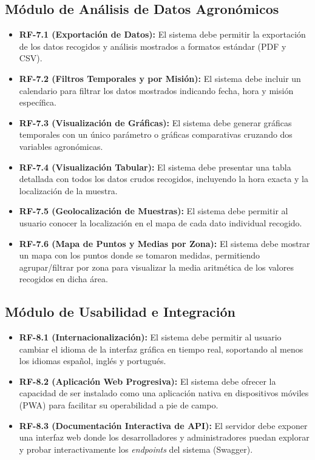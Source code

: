 \subsection{Módulo de Análisis de Datos Agronómicos}
\begin{itemize}
    \item \textbf{RF-7.1 (Exportación de Datos):} El sistema debe permitir la exportación de los datos recogidos y análisis mostrados a formatos estándar (PDF y CSV).
    \item \textbf{RF-7.2 (Filtros Temporales y por Misión):} El sistema debe incluir un calendario para filtrar los datos mostrados indicando fecha, hora y misión específica.
    \item \textbf{RF-7.3 (Visualización de Gráficas):} El sistema debe generar gráficas temporales con un único parámetro o gráficas comparativas cruzando dos variables agronómicas.
    \item \textbf{RF-7.4 (Visualización Tabular):} El sistema debe presentar una tabla detallada con todos los datos crudos recogidos, incluyendo la hora exacta y la localización de la muestra.
    \item \textbf{RF-7.5 (Geolocalización de Muestras):} El sistema debe permitir al usuario conocer la localización en el mapa de cada dato individual recogido.
    \item \textbf{RF-7.6 (Mapa de Puntos y Medias por Zona):} El sistema debe mostrar un mapa con los puntos donde se tomaron medidas, permitiendo agrupar/filtrar por zona para visualizar la media aritmética de los valores recogidos en dicha área.
\end{itemize}

\subsection{Módulo de Usabilidad e Integración}
\begin{itemize}
    \item \textbf{RF-8.1 (Internacionalización):} El sistema debe permitir al usuario cambiar el idioma de la interfaz gráfica en tiempo real, soportando al menos los idiomas español, inglés y portugués.
    \item \textbf{RF-8.2 (Aplicación Web Progresiva):} El sistema debe ofrecer la capacidad de ser instalado como una aplicación nativa en dispositivos móviles (PWA) para facilitar su operabilidad a pie de campo.
    \item \textbf{RF-8.3 (Documentación Interactiva de API):} El servidor debe exponer una interfaz web donde los desarrolladores y administradores puedan explorar y probar interactivamente los \textit{endpoints} del sistema (Swagger).
\end{itemize}

